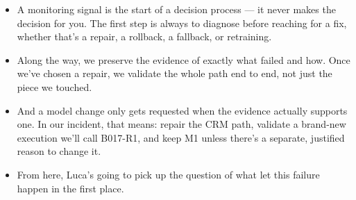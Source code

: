 \documentclass[11pt,a4paper]{article}
\begin{document}
\begin{examplebox}[title after break={SPOKEN SCRIPT --- slide 25 continued}]
\begin{itemize}
\item A monitoring signal is the start of a decision process — it never makes the decision for you. The first step is always to diagnose before reaching for a fix, whether that's a repair, a rollback, a fallback, or retraining.
\item Along the way, we preserve the evidence of exactly what failed and how. Once we've chosen a repair, we validate the whole path end to end, not just the piece we touched.
\item And a model change only gets requested when the evidence actually supports one. In our incident, that means: repair the CRM path, validate a brand-new execution we'll call B017-R1, and keep M1 unless there's a separate, justified reason to change it.
\item From here, Luca's going to pick up the question of what let this failure happen in the first place.
\end{itemize}
\end{examplebox}
\par\noindent{\scriptsize\textcolor{teal!60!black}{Reading anchor: Bass, Ch. 11 / §14.1.5}}
\clearpage
\end{document}
